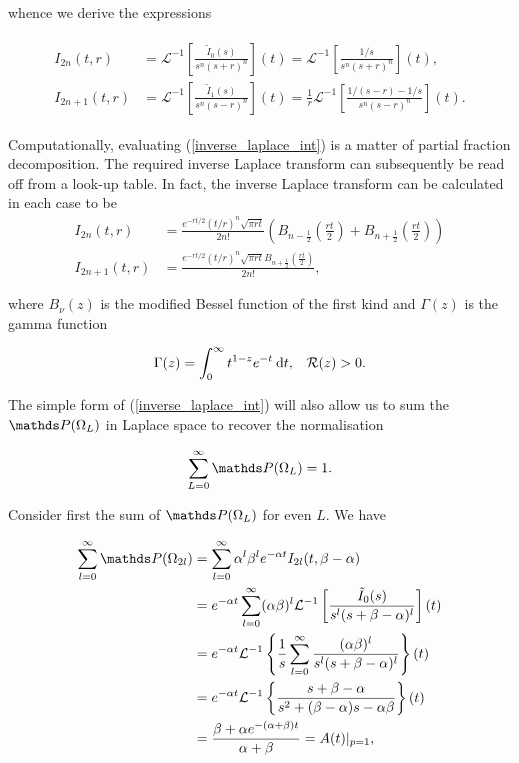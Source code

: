whence we derive the expressions 

\begin{align}\label{inverse_laplace_int}
\begin{split}
I_{2n}(t,r) &= \mathcal{L}^{-1}\left [ \frac {\tilde{I}_0(s)}{s^n(s+r)^n}\right](t) =\mathcal{L}^{-1}\left [ \frac {1/s}{s^n(s+r)^n}\right](t) , \\
I_{2n+1}(t,r) &= \mathcal{L}^{-1}\left [ \frac {\tilde{I}_1(s)}{s^n(s-r)^n}\right](t) = \frac{1}{r}\mathcal{L}^{-1}\left [ \frac {1/(s-r)-1/s}{s^n(s-r)^n}\right](t).
\end{split}
\end{align}

Computationally, evaluating (\ref{inverse_laplace_int}) is a matter of partial fraction decomposition. The required inverse Laplace transform can subsequently be read off from a look-up table. In fact, the inverse Laplace transform can be calculated in each case to be 
\begin{align}
    I_{2n}(t,r) &= \frac{e^{-rt/2}(t/r)^n\sqrt{\pi rt}}{2n!}\left (B_{n-\frac{1}{2}}\left(\frac{rt}{2}\right) + B_{n+\frac{1}{2}}\left(\frac{rt}{2}\right)\right)\\
    I_{2n+1}(t,r) &= \frac{e^{-rt/2}(t/r)^n\sqrt{\pi rt}B_{n+\frac{1}{2}}\left(\frac{rt}{2}\right)}{2n!},
\end{align}

where $B_\nu(z)$ is the modified Bessel function of the first kind and $\Gamma(z)$ is the gamma function

\begin{align}
\Gamma(z) = \int_0^\infty t^{1-z}e^{-t}\:\mathrm{d} t, \; \; \; \mathcal{R}(z) > 0. 
\end{align}

The simple form of (\ref{inverse_laplace_int}) will also allow us to sum the $\bP(\Omega_L)$ in Laplace space to recover the normalisation 

\begin{equation}
\sum_{L = 0}^\infty \bP(\Omega_L) = 1.
\end{equation}

Consider first the sum of $\bP(\Omega_L)$ for even $L$. We have 

\begin{align}
\begin{split}
\sum_{l = 0}^\infty \bP(\Omega_{2l}) &= \sum_{l=0}^\infty \alpha^l\beta^le^{-\alpha t}I_{2l}(t, \beta -\alpha)\\
&= e^{-\alpha t}\sum_{l=0}^\infty (\alpha \beta)^l\mathcal{L}^{-1}\left [ \frac {\tilde{I}_0(s)}{s^l(s+\beta-\alpha)^l}\right](t) \\ 
&= e^{-\alpha t}\mathcal{L}^{-1}\left \{ \frac{1}{s}\sum_{l=0}^\infty\frac{(\alpha\beta)^l}{s^l(s+\beta-\alpha)^l}\right\}(t)\\
&= e^{-\alpha t}\mathcal{L}^{-1}\left \{\frac{s+\beta - \alpha}{s^2 +(\beta - \alpha)s-\alpha\beta} \right\}(t)\\
&= \frac{\beta + \alpha e^{-(\alpha + \beta)t}}{\alpha + \beta} = A(t)|_{p=1},
\end{split}
\end{align}

